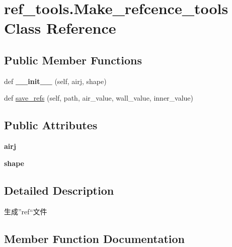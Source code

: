 \hypertarget{classref__tools_1_1Make__refcence__tools}{}\section{ref\+\_\+tools.\+Make\+\_\+refcence\+\_\+tools Class Reference}
\label{classref__tools_1_1Make__refcence__tools}
\subsection*{Public Member Functions}
\begin{DoxyCompactItemize}
\item 
\mbox{\label{classref__tools_1_1Make__refcence__tools_ac5c23318241f7837eba799263b015a27}} 
def {\bfseries \+\_\+\+\_\+init\+\_\+\+\_\+} (self, airj, shape)
\item 
def \hyperlink{classref__tools_1_1Make__refcence__tools_a0cd5805a19501f04427ce6b15ee5621e}{save\+\_\+refs} (self, path, air\+\_\+value, wall\+\_\+value, inner\+\_\+value)
\end{DoxyCompactItemize}
\subsection*{Public Attributes}
\begin{DoxyCompactItemize}
\item 
\mbox{\label{classref__tools_1_1Make__refcence__tools_a9c1827f2b261befd3ad9a653c8c9cefd}} 
{\bfseries airj}
\item 
\mbox{\label{classref__tools_1_1Make__refcence__tools_ad3798bb768f8bf15a422c3f7a22fd41a}} 
{\bfseries shape}
\end{DoxyCompactItemize}


\subsection{Detailed Description}
\begin{DoxyVerb}生成”ref“文件\end{DoxyVerb}
 

\subsection{Member Function Documentation}
\mbox{\label{classref__tools_1_1Make__refcence__tools_a0cd5805a19501f04427ce6b15ee5621e}} 
